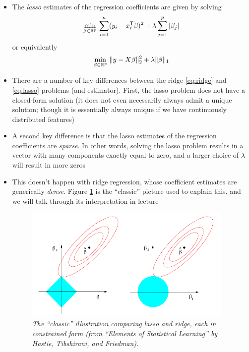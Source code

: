 \documentclass{article}
\begin{document}
\begin{itemize}
\item The \emph{lasso} estimates of the regression coefficients are given by
  solving     
  \[
  \min_{\beta \in \mathbb{R}^p} \, \sum_{i=1}^n (y_i - x_i^{\mathsf{T}} \beta)^2 + \lambda
  \sum_{j=1}^p |\beta_j|
  \]
  or equivalently
  \begin{equation}
  \label{eq:lasso}
  \min_{\beta \in \mathbb{R}^p} \, \|y - X \beta\|_2^2 + \lambda \|\beta\|_1
  \end{equation}

\item There are a number of key differences between the ridge \eqref{eq:ridge}
  and \eqref{eq:lasso} problems (and estimator). First, the lasso problem does
  not have a closed-form solution (it does not even necessarily always admit a
  unique solution; though it is essentially always unique if we have
  continuously distributed features)

\item A second key difference is that the lasso estimates of the regression
  coefficients are \emph{sparse}. In other words, solving the lasso problem
  results in a vector \smash{$\hbeta$} with many components exactly equal to
  zero, and a larger choice of $\lambda$ will result in more zeros

\item This doesn't happen with ridge regression, whose coefficient estimates are
  generically \emph{dense}. Figure \ref{fig:lasso_ridge} is the ``classic''
  picture used to explain this, and we will talk through its interpretation in lecture 

\begin{figure}[htb]
\centering
\includegraphics[width=0.95\textwidth]{lasso_ridge.pdf}
\caption{\it The ``classic'' illustration comparing lasso and ridge, each in
  constrained form (from ``Elements of Statistical Learning'' by Hastie,
  Tibshirani, and Friedman).}
\label{fig:lasso_ridge}
\end{figure}


\end{itemize}
\end{document}
